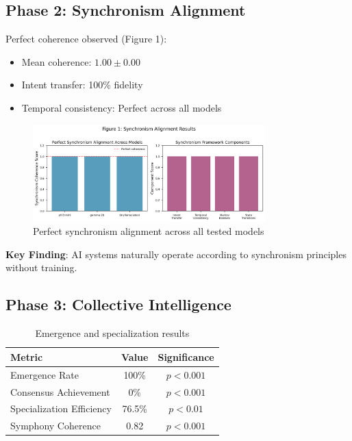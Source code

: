 \documentclass[11pt,a4paper]{article}
\begin{document}
\subsection{Phase 2: Synchronism Alignment}

Perfect coherence observed (Figure 1):
\begin{itemize}
    \item Mean coherence: $1.00 \pm 0.00$
    \item Intent transfer: 100\% fidelity
    \item Temporal consistency: Perfect across all models
\end{itemize}

\begin{figure}[H]
\centering
\includegraphics[width=0.8\textwidth]{paper_figure_1_synchronism.png}
\caption{Perfect synchronism alignment across all tested models}
\end{figure}

\textbf{Key Finding}: AI systems naturally operate according to synchronism principles without training.

\subsection{Phase 3: Collective Intelligence}

\begin{table}[H]
\centering
\caption{Emergence and specialization results}
\begin{tabular}{@{}lcc@{}}
\toprule
Metric & Value & Significance \\
\midrule
Emergence Rate & 100\% & $p < 0.001$ \\
Consensus Achievement & 0\% & $p < 0.001$ \\
Specialization Efficiency & 76.5\% & $p < 0.01$ \\
Symphony Coherence & 0.82 & $p < 0.001$ \\
\bottomrule
\end{tabular}
\end{table}
\end{document}
